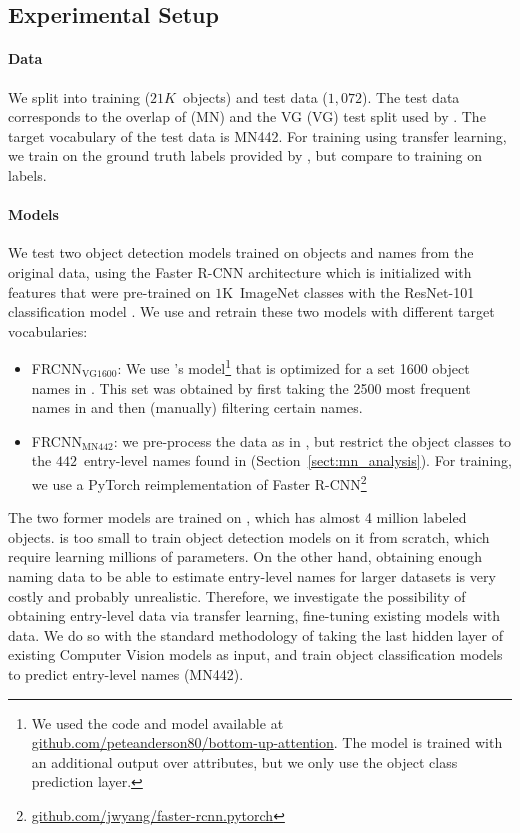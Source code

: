 \subsection{Experimental Setup}
\label{sect:exp_setup}

\paragraph{Data}
We split \mn into training ($21K$~objects) and test data ($1,072$). 
The test data corresponds to the overlap of \mn (MN) and the VG (VG) test split used by  . 
The target vocabulary of the test data is MN442. %
For training using transfer learning, we train on the ground truth labels provided by \mn, but compare to training on \vg labels. 

\paragraph{Models}

We test two object detection models trained on objects and names from the original \vg data, using the Faster R-CNN architecture \cite{fasterrcnn2015} which is initialized with features that were pre-trained on $1$K~ImageNet classes with the ResNet-101 classification model \cite{he2016deep}.
We use and retrain these two models with different target vocabularies:

\begin{itemize}
\item FRCNN$_{\text{VG1600}}$: We use \citep{anderson2018updown}'s model\footnote{We used the code and model available at  \url{github.com/peteanderson80/bottom-up-attention}. The model is trained with an additional output over attributes, but we only use the object class prediction layer.} that is optimized for a set 1600 object names in \vg. This set was obtained by first taking the 2500 most frequent names in \vg and then (manually) filtering certain names.
 \item  FRCNN$_{\text{MN442}}$: we pre-process the \vg data as in \citeauthor{anderson2018updown}, but restrict the object classes to the $442$~entry-level names found in \mn (Section~\ref{sect:mn_analysis}). 
For training, we use a PyTorch reimplementation of Faster R-CNN\footnote{\url{github.com/jwyang/faster-rcnn.pytorch}}
\end{itemize}

The two former models are trained on \vg, which has almost 4 million labeled objects.
\mn is too small to train object detection models on it from scratch, which require learning millions of parameters.
On the other hand, obtaining enough naming data to be able to estimate entry-level names for larger datasets is very costly and probably unrealistic.
Therefore, we investigate the possibility of obtaining entry-level data via transfer learning, fine-tuning existing models with \mn data.
We do so with the standard methodology of taking the last hidden layer of existing Computer Vision models as input, and train object classification models to predict entry-level names (MN442).

